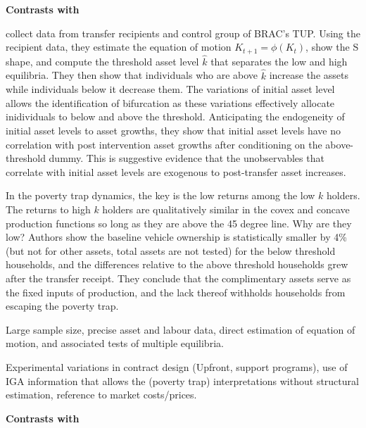 \textbf{\textbf{Contrasts with \citet{Balboni2020}}}
\setlength{\parindent}{1em}

	\citet{Balboni2020} collect data from transfer recipients and control group of BRAC's TUP. Using the recipient data, they estimate the equation of motion $K_{t+1}=\phi(K_{t})$, show the S shape, and compute the threshold asset level $\hat{k}$ that separates the low and high equilibria. They then show that individuals who are above $\hat{k}$ increase the assets while individuals below it decrease them. The variations of initial asset level allows the identification of bifurcation as these variations effectively allocate inidividuals to below and above the threshold. Anticipating the endogeneity of initial asset levels to asset growths, they show that initial asset levels have no correlation with post intervention asset growths after conditioning on the above-threshold dummy. This is suggestive evidence that the unobservables that correlate with initial asset levels are exogenous to post-transfer asset increases.

	In the poverty trap dynamics, the key is the low returns among the low $k$ holders. The returns to high $k$ holders are qualitatively similar in the covex and concave production functions so long as they are above the 45 degree line. Why are they low? Authors show the baseline vehicle ownership is statistically smaller by 4\% (but not for other assets, total assets are not tested) for the below threshold households, and the differences relative to the above threshold households grew after the transfer receipt. They conclude that the complimentary assets serve as the fixed inputs of production, and the lack thereof withholds households from escaping the poverty trap.

\begin{description}
\vspace{1.0ex}\setlength{\itemsep}{1.0ex}\setlength{\baselineskip}{12pt}
\item[their strength]	Large sample size, precise asset and labour data, direct estimation of equation of motion, and associated tests of multiple equilibria.
\item[our strength]	Experimental variations in contract design (\textsf{Upfront}, support programs), use of IGA information that allows the (poverty trap) interpretations without structural estimation, reference to market costs/prices. 
\end{description}

\noindent
\textbf{\textbf{Contrasts with \citet{Banerjee2019MFPovertyTrap}}}


